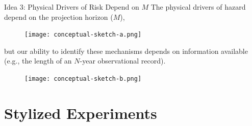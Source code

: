 \documentclass[
  10pt,     %
]{beamer}
\makeatletter
\newcommand*{\eg}{e.g.\@\xspace}
\makeatother
\begin{document}
\begin{frame}{Idea 3: Physical Drivers of Risk Depend on $M$}
  The physical drivers of hazard depend on the projection horizon ($M$),
  \begin{figure}
    \centering
    \texttt{[image: conceptual-sketch-a.png]}\\
  \end{figure}
  \pause
  but our ability to identify these mechanisms depends on information available (\eg, the length of an $N$-year observational record).
  \begin{figure}
    \centering
    \texttt{[image: conceptual-sketch-b.png]}
  \end{figure}
\end{frame}

\section{Stylized Experiments}
\end{document}

